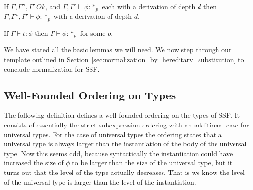 \begin{lemma}
  If $\Gamma,\Gamma'',\Gamma'\ Ok$, and $\Gamma,\Gamma' \vdash \phi:*_p$ each with a 
  derivation of depth $d$ then $\Gamma,\Gamma'',\Gamma' \vdash \phi:*_p$ with a 
  derivation of depth $d$.
  \label{lemma:context_weakening_for_kinding_ssf}
\end{lemma}

\begin{lemma}[Regularity]
  If $\Gamma \vdash t:\phi$ then $\Gamma \vdash \phi:*_p$ for some $p$.
  \label{lemma:regularity_ssf}
\end{lemma}
\noindent
We have stated all the basic lemmas we will need.  We now step through
our template outlined in
Section~\ref{sec:normalization_by_hereditary_substitution} to conclude
normalization for SSF.

\subsection{Well-Founded Ordering on Types}
\label{subsec:well-founded_ordering_on_types_ssf}
The following definition defines a well-founded ordering on the types
of SSF.  It consists of essentially the strict-subexpression ordering
with an additional case for universal types.  For the case of
universal types the ordering states that a universal type is always
larger than the instantiation of the body of the universal type.  Now
this seems odd, because syntactically the instantiation could have
increased the size of $\phi$ to be larger than the size of the
universal type, but it turns out that the level of the
type actually decreases.  That is we know the level of the universal
type is larger than the level of the instantiation.

